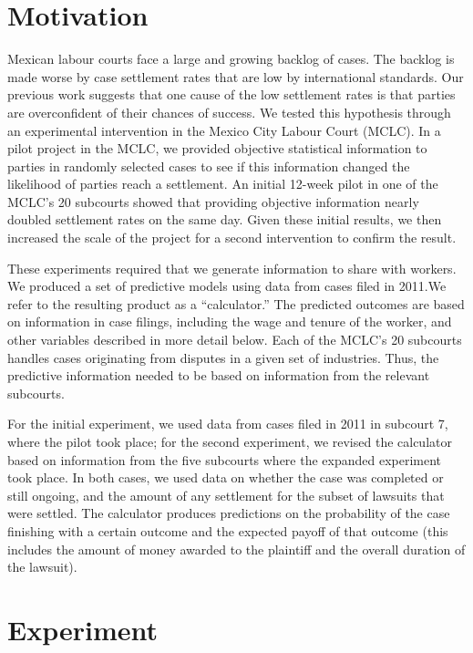 \documentclass[]{article}
\title{}
\author{}
\date{}
\begin{document}
\section{Motivation}\label{motivation}

Mexican labour courts face a large and growing backlog of cases. The
backlog is made worse by case settlement rates that are low by
international standards. Our previous work suggests that one cause of
the low settlement rates is that parties are overconfident of their
chances of success. We tested this hypothesis through an experimental
intervention in the Mexico City Labour Court (MCLC). In a pilot project
in the MCLC, we provided objective statistical information to parties in
randomly selected cases to see if this information changed the
likelihood of parties reach a settlement. An initial 12-week pilot in
one of the MCLC's 20 subcourts showed that providing objective
information nearly doubled settlement rates on the same day. Given these
initial results, we then increased the scale of the project for a second
intervention to confirm the result.

These experiments required that we generate information to share with
workers. We produced a set of predictive models using data from cases
filed in 2011.We refer to the resulting product as a ``calculator.'' The
predicted outcomes are based on information in case filings, including
the wage and tenure of the worker, and other variables described in more
detail below. Each of the MCLC's 20 subcourts handles cases originating
from disputes in a given set of industries. Thus, the predictive
information needed to be based on information from the relevant
subcourts.

For the initial experiment, we used data from cases filed in 2011 in
subcourt 7, where the pilot took place; for the second experiment, we
revised the calculator based on information from the five subcourts
where the expanded experiment took place. In both cases, we used data on
whether the case was completed or still ongoing, and the amount of any
settlement for the subset of lawsuits that were settled. The calculator
produces predictions on the probability of the case finishing with a
certain outcome and the expected payoff of that outcome (this includes
the amount of money awarded to the plaintiff and the overall duration of
the lawsuit).

\section{Experiment}\label{experiment}
\end{document}
